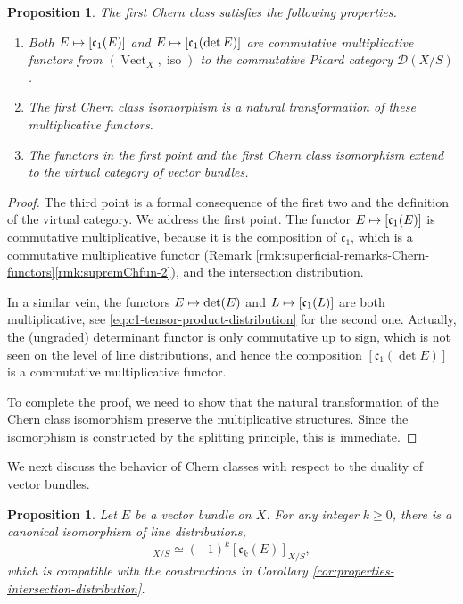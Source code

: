 \documentclass[JEP,XML,SOM,Unicode,published]{cedram}
\newcommand\mto{\mathchoice{\longmapsto}{\mapsto}{\mapsto}{\mapsto}}
\theoremstyle{plain}
\newtheorem{proposition}[theorem]{Proposition}
\theoremstyle{definition}
\newcommand{\Dcal}{\mathcal D}
\newcommand{\cfrak}{\mathfrak c}
\DeclareMathOperator{\iso}{iso}
\DeclareMathOperator{\Vect}{Vect}
\begin{document}
\begin{proposition}\label{prop:isom-first-chern-functorial}
The first Chern class satisfies the following properties.

\begin{enumerate}
\item Both $E\mto [\cfrak_{1}(E)]$ and $E\mto [\cfrak_{1}(\det E)]$ are commutative multiplicative functors from $(\Vect_{X},\iso)$ to the commutative Picard category $\Dcal(X/S)$.
\item The first Chern class isomorphism is a natural transformation of these multiplicative functors.
\item The functors in the first point and the first Chern class isomorphism extend to the virtual category of vector bundles.
\end{enumerate}
\end{proposition}

\begin{proof}
The third point is a formal consequence of the first two and the definition of the virtual category. We address the first point. The functor $E\mto [\cfrak_{1}(E)]$ is commutative multiplicative, because it is the composition of $\cfrak_{1}$, which is a commutative multiplicative functor (\cf Remark \ref{rmk:superficial-remarks-Chern-functors}\eqref{rmk:supremChfun-2}), and the intersection distribution.

In a similar vein, the functors $E \mto \det (E)$ and $L \mto [\cfrak_1(L)]$ are both multiplicative, see \eqref{eq:c1-tensor-product-distribution} for the second one. Actually, the (ungraded) determinant functor is only commutative up to sign, which is not seen on the level of line distributions, and hence the composition $[\cfrak_1(\det E)]$ is a commutative multiplicative functor.

To complete the proof, we need to show that the natural transformation of the Chern class isomorphism preserve the multiplicative structures. Since the isomorphism is constructed by the splitting principle, this is immediate.
\end{proof}

We next discuss the behavior of Chern classes with respect to the duality of vector bundles.

\begin{proposition} \label{prop:Cherndual}
Let $E$ be a vector bundle on $X$. For any integer $k\geq 0$, there is a canonical isomorphism of line distributions,
\begin{displaymath}
[\cfrak_k(E^\vee)]_{X/S} \simeq {(-1)^k} [ \cfrak_k(E) ]_{X/S},
\end{displaymath}
which is compatible with the constructions in Corollary \ref{cor:properties-intersection-distribution}.
\end{proposition}
\end{document}
